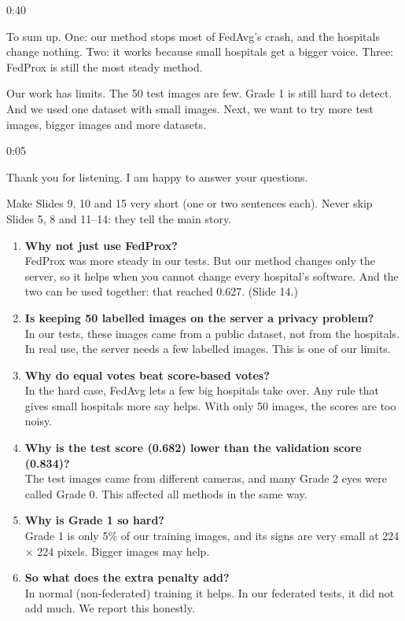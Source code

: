 \documentclass[12pt,a4paper]{article}
\newcommand{\slide}[3]{%
  \par\bigskip\noindent{\color{accent}\large\bfseries Slide #1 \textperiodcentered\ #2}%
  \hfill{\color{muted}\small #3}\par\smallskip}
\begin{document}
\slide{16}{Takeaways}{0:40}
To sum up. One: our method stops most of FedAvg's crash, and the hospitals change nothing. Two:
it works because small hospitals get a bigger voice. Three: FedProx is still the most steady
method.

Our work has limits. The 50 test images are few. Grade 1 is still hard to detect. And we used one
dataset with small images. Next, we want to try more test images, bigger images and more
datasets.

\slide{17}{Thank you}{0:05}
Thank you for listening. I am happy to answer your questions.

\bigskip
{}\par
Make Slides 9, 10 and 15 very short (one or two sentences each). Never skip Slides 5, 8 and
11--14: they tell the main story.

\bigskip
{}
\begin{enumerate}[leftmargin=*,itemsep=6pt]
  \item \textbf{Why not just use FedProx?}\\
  FedProx was more steady in our tests. But our method changes only the server, so it helps when
  you cannot change every hospital's software. And the two can be used together: that reached
  0.627. (Slide 14.)
  \item \textbf{Is keeping 50 labelled images on the server a privacy problem?}\\
  In our tests, these images came from a public dataset, not from the hospitals. In real use,
  the server needs a few labelled images. This is one of our limits.
  \item \textbf{Why do equal votes beat score-based votes?}\\
  In the hard case, FedAvg lets a few big hospitals take over. Any rule that gives small
  hospitals more say helps. With only 50 images, the scores are too noisy.
  \item \textbf{Why is the test score (0.682) lower than the validation score (0.834)?}\\
  The test images came from different cameras, and many Grade 2 eyes were called Grade 0. This
  affected all methods in the same way.
  \item \textbf{Why is Grade 1 so hard?}\\
  Grade 1 is only 5\% of our training images, and its signs are very small at 224 $\times$ 224
  pixels. Bigger images may help.
  \item \textbf{So what does the extra penalty add?}\\
  In normal (non-federated) training it helps. In our federated tests, it did not add much. We
  report this honestly.
\end{enumerate}
\end{document}

